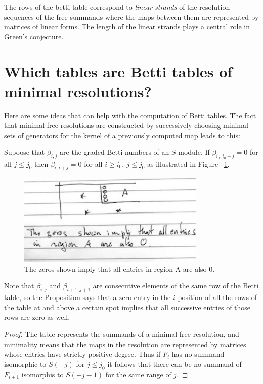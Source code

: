 The rows of the betti table correspond to \emph{linear strands} of the resolution---sequences of the free summands where the maps between them are represented by matrices of linear forms. The length of the linear strands plays a central role in Green's conjecture. 


\section{Which tables are Betti tables of minimal resolutions?}\label{which tables}
Here are some ideas that can help with the computation of Betti tables. The fact that minimal free resolutions are
constructed by successively choosing minimal sets of generators for the kernel of a previously 
computed map leads to this:

\begin{proposition}\label{zero implications}
Supoose that $\beta_{i,j}$ are the graded Betti numbers of an $S$-module. If $\beta_{i_{0},i_{0}+j} = 0$ for all $j\leq j_{0}$  then
$\beta_{i, i+j} = 0$ for all $i\geq i_{0},\ j\leq j_{0}$ as illustrated in Figure ~\ref{17.2.1}.
\end{proposition}
\begin{figure}[ht!]
\centering
\includegraphics[width=90mm]{illust-17-2-1.pdf}
\caption{The zeros shown imply that all entries in region A are also 0.\label{17.2.1}}
\end{figure}
Note that $\beta_{i,j}$ and $\beta_{i+1,j+1}$ are consecutive elements of the same row of the Betti
table, so the Proposition says that a zero entry in the $i$-position of all the rows of the table at and above
a certain spot implies that all successive entries
of those rows are zero as well.

\begin{proof}
The table represents the summands of a minimal free resolution, and minimality means that the maps in the resolution are represented by matrices whose entries have strictly positive degree. Thus if
$F_{i}$ has no summand isomorphic to $S(-j)$ for $j\leq j_{0}$ it follows that there can be no summand
of $F_{i+1}$ isomorphis to $S(-j-1)$ for the same range of $j$.
\end{proof}

